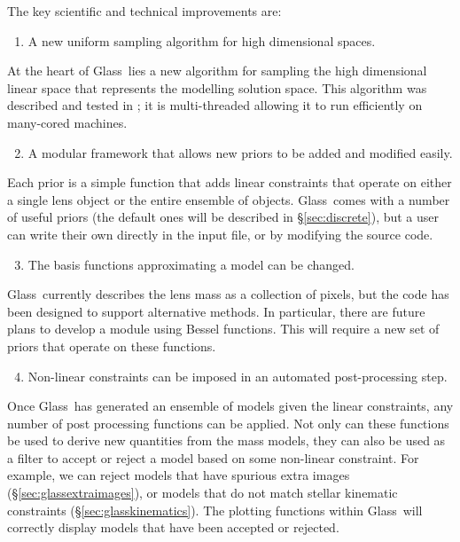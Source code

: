\documentclass[galley,usenatbib]{mn2e}
\newcommand{\Glass}{{\sc Glass}}
\newcommand{\secref}[1] {\S\ref{#1}}
\begin{document}
The key scientific and technical improvements are:
%
\begin{enumerate}
  \setcounter{enumi}{0}
  \item A new uniform sampling algorithm for high dimensional spaces.
\end{enumerate}
%
At the heart of \Glass\ lies a new algorithm for sampling the high dimensional
linear space that represents the modelling solution space. This algorithm was
described and tested in \cite{2012MNRAS.425.3077L}; it is multi-threaded
allowing it to run efficiently on many-cored machines.
%
\begin{enumerate}
  \setcounter{enumi}{1}
  \item A modular framework that allows new priors to be added and modified easily.
\end{enumerate}
%
Each prior is a simple function that adds linear constraints that operate on
either a single lens object or the entire ensemble of objects. \Glass\ comes
with a number of useful priors (the default ones will be described in \secref{sec:discrete}), but a
user can write their own directly in the input file, or by modifying the source
code.
%
\begin{enumerate}
  \setcounter{enumi}{2}
  \item The basis functions approximating a model can be changed. 
\end{enumerate}
%
\Glass\ currently describes the lens mass as a collection of pixels, but the
code has been designed to support alternative methods. In particular, there are
future plans to develop a module using Bessel functions. This will require a
new set of priors that operate on these functions.
%
\begin{enumerate}
  \setcounter{enumi}{3}
  \item Non-linear constraints can be imposed in an automated post-processing step. 
\end{enumerate}
%
Once \Glass\ has generated an ensemble of models given the linear constraints,
any number of post processing functions can be applied. Not only can these
functions be used to derive new quantities from the mass models, they can also
be used as a filter to accept or reject a model based on some non-linear
constraint. For example, we can reject models that have spurious extra images
(\secref{sec:glassextraimages}), or models that do not match stellar kinematic
constraints (\secref{sec:glasskinematics}). The plotting functions within
\Glass\ will correctly display models that have been accepted or rejected.
\end{document}
